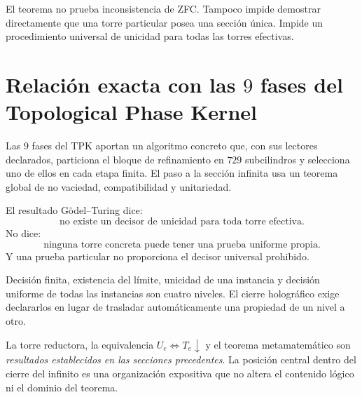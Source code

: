 \begin{remark}
El teorema no prueba inconsistencia de ZFC. Tampoco impide demostrar
directamente que una torre particular posea una sección única. Impide un
procedimiento universal de unicidad para todas las torres efectivas.
\end{remark}

\section{Relación exacta con las \(9\) fases del Topological Phase Kernel}

Las \(9\) fases del TPK aportan un algoritmo concreto que, con sus lectores declarados,
particiona el bloque de refinamiento en \(729\) subcilindros y selecciona uno de ellos
en cada etapa finita.
El paso a la sección infinita usa un teorema global de no vaciedad,
compatibilidad y unitariedad.

El resultado Gödel--Turing dice:
\[
\text{no existe un decisor de unicidad para toda torre efectiva}.
\]
No dice:
\[
\text{ninguna torre concreta puede tener una prueba uniforme propia}.
\]
Y una prueba particular no proporciona el decisor universal prohibido.


\begin{remark}
Decisión finita, existencia del límite, unicidad de una instancia y decisión
uniforme de todas las instancias son cuatro niveles. El cierre holográfico
exige declararlos en lugar de trasladar automáticamente una propiedad de un
nivel a otro.
\end{remark}

\begin{remark}
La torre reductora, la equivalencia \(U_e\iff T_e\downarrow\) y el teorema
metamatemático son \emph{resultados establecidos en las secciones precedentes}. La posición central dentro
del cierre del infinito es una organización expositiva que no altera el contenido lógico ni el dominio del teorema.
\end{remark}
